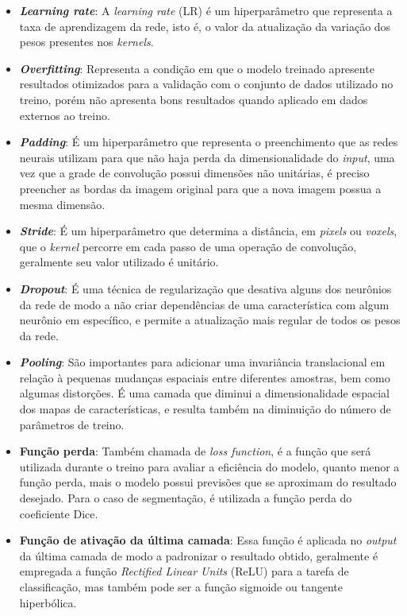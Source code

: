 \begin{itemize}
    \item \textbf{\textit{Learning rate}}: A \textit{learning rate} (LR) é um hiperparâmetro que representa a taxa de aprendizagem da rede, isto é, o valor da atualização da variação dos pesos presentes nos \textit{kernels}.
    \item \textbf{\textit{Overfitting}}: Representa a condição em que o modelo treinado apresente resultados otimizados para a validação com o conjunto de dados utilizado no treino, porém não apresenta bons resultados quando aplicado em dados externos ao treino.
    \item \textbf{\textit{Padding}}: É um hiperparâmetro que representa o preenchimento que as redes neurais utilizam para que não haja perda da dimensionalidade do \textit{input}, uma vez que a grade de convolução possui dimensões não unitárias, é preciso preencher as bordas da imagem original para que a nova imagem possua a mesma dimensão.
    \item \textbf{\textit{Stride}}: É um hiperparâmetro que determina a distância, em \textit{pixels} ou \textit{voxels}, que o \textit{kernel} percorre em cada passo de uma operação de convolução, geralmente seu valor utilizado é unitário.
    \item \textbf{\textit{Dropout}}: É uma técnica de regularização que desativa alguns dos neurônios da rede de modo a não criar dependências de uma característica com algum neurônio em específico, e permite a atualização mais regular de todos os pesos da rede.
    \item \textbf{\textit{Pooling}}: São importantes para adicionar uma invariância translacional em relação à pequenas mudanças espaciais entre diferentes amostras, bem como algumas distorções. É uma camada que diminui a dimensionalidade espacial dos mapas de características, e resulta também na diminuição do número de parâmetros de treino.
    \item \textbf{Função perda}: Também chamada de \textit{loss function}, é a função que será utilizada durante o treino para avaliar a eficiência do modelo, quanto menor a função perda, mais o modelo possui previsões que se aproximam do resultado desejado. Para o caso de segmentação, é utilizada a função perda do coeficiente Dice.
    \item \textbf{Função de ativação da última camada}: Essa função é aplicada no \textit{output} da última camada de modo a padronizar o resultado obtido, geralmente é empregada a função \textit{Rectified Linear Units} (ReLU) para a tarefa de classificação, mas também pode ser a função sigmoide ou tangente hiperbólica.

\end{itemize}
